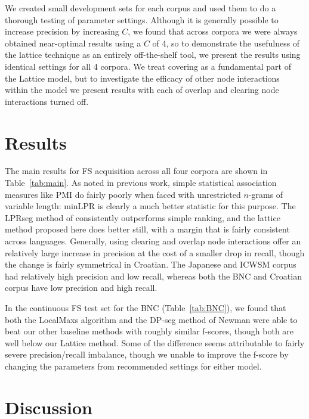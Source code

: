 \documentclass[11pt,letterpaper]{article}
\newcommand{\tabref}[2][]{Table#1~\ref{#2}\xspace}
\begin{document}
We created small development sets for each corpus and used them to do a thorough testing of parameter settings. Although it is generally possible to increase precision by increasing $C$, we found that across corpora we were always obtained near-optimal results using a $C$ of 4, so to demonstrate the usefulness of the lattice technique as an entirely off-the-shelf tool, we present the results using identical settings for all 4 corpora. We treat covering as a fundamental part of the Lattice model, but to investigate the efficacy of other node interactions within the model we present results with each of overlap and clearing node interactions turned off.
		

\section{Results}

The main results for FS acquisition across all four corpora are shown in \tabref{tab:main}. As noted in previous work, simple statistical association measures like PMI do fairly poorly when faced with unrestricted $n$-grams of variable length: minLPR is clearly a much better statistic for this purpose. The LPRseg method of  consistently outperforms simple ranking, and the lattice method proposed here does better still, with a margin that is fairly consistent across languages. Generally, using clearing and overlap node interactions offer an relatively large increase in precision at the cost of a smaller drop in recall, though the change is fairly symmetrical in Croatian. The Japanese and ICWSM corpus had relatively high precision and low recall, whereas both the BNC and Croatian corpus have low precision and high recall.

In the continuous FS test set for the BNC (\tabref{tab:BNC}), we found that both the LocalMaxs algorithm and the DP-seg method of Newman \cite{Newman12} were able to beat our other baseline methods with roughly similar f-scores, though both are well below our Lattice method. Some of the difference seems attributable to fairly severe precision/recall imbalance, though we unable to improve the f-score by changing the parameters from recommended settings for either model.


\section{Discussion} \label{sec:discussion}
\end{document}
